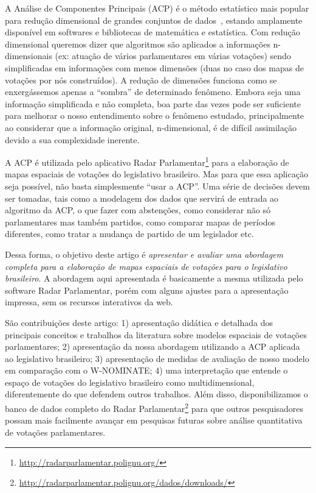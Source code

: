\documentclass[a4paper, 12pt]{article}
\newcommand\wnominate{W-NOMINATE\xspace}
\begin{document}
A Análise de Componentes Principais (ACP) é o método estatístico mais popular para redução dimensional de grandes conjuntos de dados~\cite{DataMining2003}, estando amplamente disponível em softwares e bibliotecas de matemática e estatística. Com redução dimensional queremos dizer que algoritmos são aplicados a informações n-dimensionais (ex: atuação de vários parlamentares em várias votações) sendo simplificadas em informações com menos dimensões (duas no caso dos mapas de votações por nós construídos). A redução de dimensões funciona como se enxergássemos apenas a ``sombra'' de determinado fenômeno. Embora seja uma informação simplificada e não completa, boa parte das vezes pode ser suficiente para melhorar o nosso entendimento sobre o fenômeno estudado, principalmente ao considerar que a informação original, n-dimensional, é de difícil assimilação devido a sua complexidade inerente.

A ACP é utilizada pelo aplicativo Radar Parlamentar\footnote{\url{http://radarparlamentar.polignu.org/}} para a elaboração de mapas espaciais de votações do legislativo brasileiro. Mas para que essa aplicação seja possível, não basta simplesmente ``usar a ACP''. Uma série de decisões devem ser tomadas, tais como a modelagem dos dados que servirá de entrada ao algoritmo da ACP, o que fazer com abstenções, como considerar não só parlamentares mas também partidos, como comparar mapas de períodos diferentes, como tratar a mudança de partido de um legislador etc.

Dessa forma, o objetivo deste artigo é \emph{apresentar e avaliar uma abordagem completa para a elaboração de mapas espaciais de votações para o legislativo brasileiro}. A abordagem aqui apresentada é basicamente a mesma utilizada pelo software Radar Parlamentar, porém com alguns ajustes para a apresentação impressa, sem os recursos interativos da web.

São contribuições deste artigo: 1) apresentação didática e detalhada dos principais conceitos e trabalhos da literatura sobre modelos espaciais de votações parlamentares; 2) apresentação da nossa abordagem utilizando a ACP aplicada ao legislativo brasileiro; 3) apresentação de medidas de avaliação de nosso modelo em comparação com o \wnominate; 4) uma interpretação que entende o espaço de votações do legislativo brasileiro como multidimensional, diferentemente do que defendem outros trabalhos. Além disso, disponibilizamos o banco de dados completo do Radar Parlamentar\footnote{\url{http://radarparlamentar.polignu.org/dados/downloads/}} para que outros pesquisadores possam mais facilmente avançar em pesquisas futuras sobre análise quantitativa de votações parlamentares.
\end{document}
